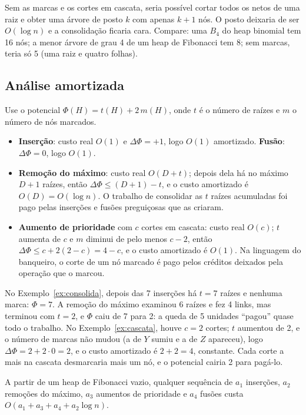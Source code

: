 Sem as marcas e os cortes em cascata, seria possível cortar todos os netos de uma raiz e obter uma árvore de posto $k$ com apenas $k+1$ nós. O posto deixaria de ser $O(\log n)$ e a consolidação ficaria cara. Compare: uma $B_4$ do heap binomial tem 16 nós; a menor árvore de grau 4 de um heap de Fibonacci tem 8; sem marcas, teria só 5 (uma raiz e quatro folhas).

\subsection{Análise amortizada}
Use o potencial $\Phi(H)=t(H)+2\,m(H)$, onde $t$ é o número de raízes e $m$ o número de nós marcados.
\begin{itemize}
  \item \textbf{Inserção}: custo real $O(1)$ e $\Delta\Phi=+1$, logo $O(1)$ amortizado. \textbf{Fusão}: $\Delta\Phi=0$, logo $O(1)$.
  \item \textbf{Remoção do máximo}: custo real $O(D+t)$; depois dela há no máximo $D+1$ raízes, então $\Delta\Phi\le(D+1)-t$, e o custo amortizado é $O(D)=O(\log n)$. O trabalho de consolidar as $t$ raízes acumuladas foi pago pelas inserções e fusões preguiçosas que as criaram.
  \item \textbf{Aumento de prioridade} com $c$ cortes em cascata: custo real $O(c)$; $t$ aumenta de $c$ e $m$ diminui de pelo menos $c-2$, então $\Delta\Phi\le c+2(2-c)=4-c$, e o custo amortizado é $O(1)$. Na linguagem do banqueiro, o corte de um nó marcado é pago pelos créditos deixados pela operação que o marcou.
\end{itemize}

\begin{exemplo}\label{ex:potencial}
No Exemplo~\ref{ex:consolida}, depois das 7 inserções há $t=7$ raízes e nenhuma marca: $\Phi=7$. A remoção do máximo examinou 6 raízes e fez 4 links, mas terminou com $t=2$, e $\Phi$ caiu de 7 para 2: a queda de 5 unidades ``pagou'' quase todo o trabalho. No Exemplo~\ref{ex:cascata}, houve $c=2$ cortes; $t$ aumentou de 2, e o número de marcas não mudou (a de $Y$ sumiu e a de $Z$ apareceu), logo $\Delta\Phi=2+2\cdot0=2$, e o custo amortizado é $2+2=4$, constante. Cada corte a mais na cascata desmarcaria mais um nó, e o potencial cairia 2 para pagá-lo.
\end{exemplo}

\begin{teo}
A partir de um heap de Fibonacci vazio, qualquer sequência de $a_1$ inserções, $a_2$ remoções do máximo, $a_3$ aumentos de prioridade e $a_4$ fusões custa $O(a_1+a_3+a_4+a_2\log n)$.
\end{teo}

